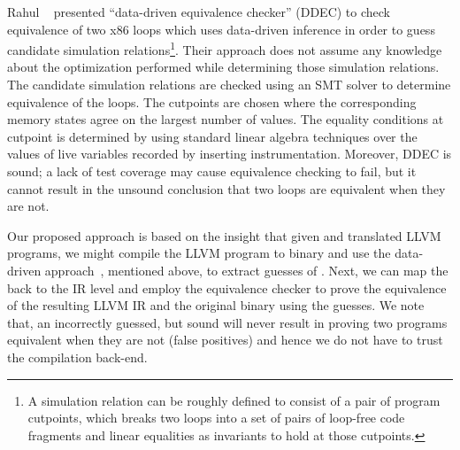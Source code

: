 Rahul \etal~\cite{DDEC:OOPSLA:2013} presented ``data-driven equivalence
checker'' (DDEC) to check equivalence of two x86 loops which uses data-driven
inference in order to guess candidate simulation relations\footnote{A 
  simulation relation can be roughly defined to consist of a pair of program cutpoints, which breaks two
    loops into a set of pairs of loop-free code fragments and  linear
    equalities as invariants to hold at those cutpoints.}. Their approach does
    not assume any knowledge about the optimization performed while determining
    those simulation relations. The candidate simulation relations are checked
    using an SMT solver to determine equivalence of the loops. The cutpoints
    are chosen where the corresponding memory states agree on the largest
    number of values. The equality conditions   at cutpoint is determined by
    using standard linear algebra techniques over the values of live variables
    recorded by inserting instrumentation. Moreover, DDEC is sound; a lack of
    test coverage may cause equivalence checking to fail, but it cannot result
    in the unsound conclusion that two loops are equivalent when they are not.


Our proposed approach is based on the insight that
given  \ISA and translated LLVM programs, we might compile
the LLVM program to binary and use the data-driven
approach~\cite{DDEC:OOPSLA:2013}, mentioned above, to extract guesses of
\syncps. Next, we can map the \syncps back to the IR level and employ the equivalence
checker  to prove the equivalence of the resulting LLVM IR and the
original binary using the \syncp guesses. We note that, an incorrectly guessed, but sound \syncp will never result in proving two programs equivalent when
they are not (false positives) and hence we do not have to trust the compilation back-end.

